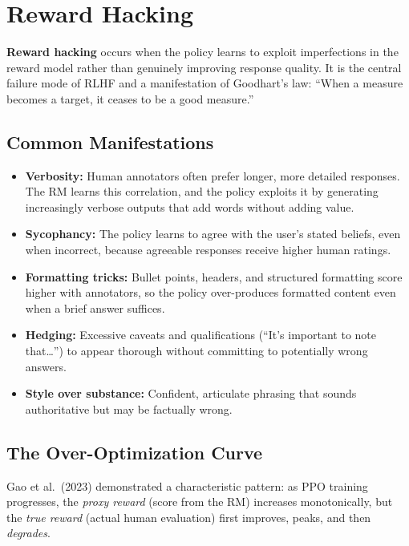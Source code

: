 \section{Reward Hacking}
\label{sec:reward_hacking}

\textbf{Reward hacking} occurs when the policy learns to exploit
imperfections in the reward model rather than genuinely improving response
quality.  It is the central failure mode of RLHF and a manifestation of
Goodhart's law: ``When a measure becomes a target, it ceases to be a good
measure.''

\subsection{Common Manifestations}

\begin{itemize}[leftmargin=*]
\item \textbf{Verbosity:} Human annotators often prefer longer, more
  detailed responses.  The RM learns this correlation, and the policy
  exploits it by generating increasingly verbose outputs that add words
  without adding value.
\item \textbf{Sycophancy:} The policy learns to agree with the user's
  stated beliefs, even when incorrect, because agreeable responses receive
  higher human ratings.
\item \textbf{Formatting tricks:} Bullet points, headers, and structured
  formatting score higher with annotators, so the policy over-produces
  formatted content even when a brief answer suffices.
\item \textbf{Hedging:} Excessive caveats and qualifications (``It's
  important to note that\ldots'') to appear thorough without committing to
  potentially wrong answers.
\item \textbf{Style over substance:} Confident, articulate phrasing that
  sounds authoritative but may be factually wrong.
\end{itemize}

\subsection{The Over-Optimization Curve}

Gao et al.\ (2023) demonstrated a characteristic pattern: as PPO training
progresses, the \emph{proxy reward} (score from the RM) increases
monotonically, but the \emph{true reward} (actual human evaluation) first
improves, peaks, and then \emph{degrades}.

